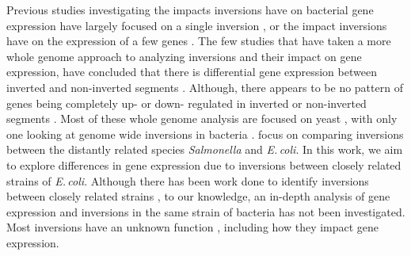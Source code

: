 \documentclass[12pt]{article}
\newcommand{\ecol}{\textit{E.\,coli}\xspace}
\newcommand{\sal}{\textit{Salmonella}\xspace}
\begin{document}

Previous studies investigating the impacts inversions have on bacterial gene expression have largely focused on a single inversion \citep{zieg1978,sekulovic2018}, or the impact inversions have on the expression of a few genes \citep{LiJ:19}. %
The few studies that have taken a more whole genome approach to analyzing inversions and their impact on gene expression, have concluded that there is differential gene expression between inverted and non-inverted segments \citep{alokam2002inversions,naseeb2016}. %
Although, there appears to be no pattern of genes being completely up- or down- regulated in inverted or non-inverted segments \citep{alokam2002inversions,naseeb2016}. %
Most of these whole genome analysis are focused on yeast \citep{naseeb2016}%
, with only one looking at genome wide inversions in bacteria \citep{alokam2002inversions}.
\citet{alokam2002inversions} focus on comparing inversions between the distantly related species \sal and \ecol.
In this work, we aim to explore differences in gene expression due to inversions between closely related strains of \ecol.
Although there has been work done to identify inversions between closely related strains \citep{sun2012}, to our knowledge, an in-depth analysis of gene expression and inversions in the same strain of bacteria has not been investigated.
Most inversions have an unknown function \citep{raeside2014}, including how they impact gene expression.

\newpage
\pagestyle{empty}

\printbibliography[heading=bibintoc]
\end{document}
